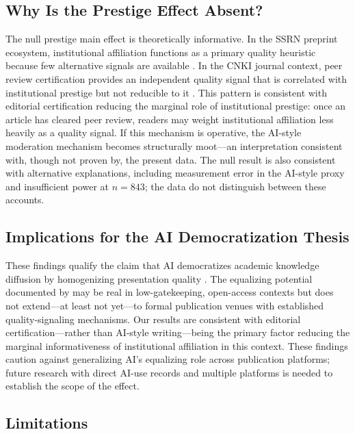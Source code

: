 \documentclass[12pt,a4paper]{article}
\begin{document}
\subsection{Why Is the Prestige Effect Absent?}

The null prestige main effect is theoretically informative.
In the SSRN preprint ecosystem, institutional affiliation functions as
a primary quality heuristic because few alternative signals are
available \citep{JoLi2026}.
In the CNKI journal context, peer review certification provides an
independent quality signal that is correlated with institutional
prestige but not reducible to it \citep{Bornmann2008}.
This pattern is consistent with editorial certification reducing the
marginal role of institutional prestige: once an article has cleared
peer review, readers may weight institutional affiliation less heavily
as a quality signal.
If this mechanism is operative, the AI-style moderation mechanism
becomes structurally moot---an interpretation consistent with, though
not proven by, the present data.
The null result is also consistent with alternative explanations,
including measurement error in the AI-style proxy and insufficient
power at $n=843$; the data do not distinguish between these accounts.

\subsection{Implications for the AI Democratization Thesis}

These findings qualify the claim that AI democratizes academic
knowledge diffusion by homogenizing presentation quality
\citep{Liang2024}.
The equalizing potential documented by \citet{JoLi2026} may be
real in low-gatekeeping, open-access contexts but does not extend---at
least not yet---to formal publication venues with established
quality-signaling mechanisms.
Our results are consistent with editorial certification---rather than
AI-style writing---being the primary factor reducing the marginal
informativeness of institutional affiliation in this context.
These findings caution against generalizing AI's equalizing role
across publication platforms; future research with direct AI-use
records and multiple platforms is needed to establish the scope of
the effect.

\subsection{Limitations}
\end{document}
